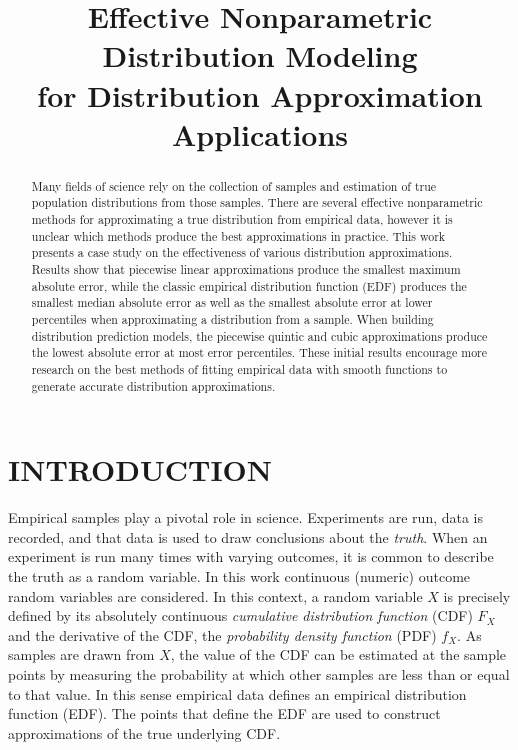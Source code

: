 \documentclass[letterpaper, 10 pt, conference]{ieeeconf}  %
\title{\LARGE \bf Effective Nonparametric Distribution Modeling \\ for Distribution Approximation Applications }
\begin{document}
\maketitle
\thispagestyle{empty}
\pagestyle{empty}

\begin{abstract}

Many fields of science rely on the collection of samples and estimation of true population distributions from those samples. There are several effective nonparametric methods for approximating a true distribution from empirical data, however it is unclear which methods produce the best approximations in practice. This work presents a case study on the effectiveness of various distribution approximations. Results show that piecewise linear approximations produce the smallest maximum absolute error, while the classic empirical distribution function (EDF) produces the smallest median absolute error as well as the smallest absolute error at lower percentiles when approximating a distribution from a sample. When building distribution prediction models, the piecewise quintic and cubic approximations produce the lowest absolute error at most error percentiles. These initial results encourage more research on the best methods of fitting empirical data with smooth functions to generate accurate distribution approximations.

\end{abstract}

\section{INTRODUCTION}
\label{sec:introduction}

Empirical samples play a pivotal role in science. Experiments are run, data is recorded, and that data is used to draw conclusions about the \textit{truth}. When an experiment is run many times with varying outcomes, it is common to describe the truth as a random variable. In this work continuous (numeric) outcome random variables are considered. In this context, a random variable $X$ is precisely defined by its absolutely continuous \textit{cumulative distribution function} (CDF) $F_X$ and the derivative of the CDF, the \textit{probability density function} (PDF) $f_X$. As samples are drawn from $X$, the value of the CDF can be estimated at the sample points by measuring the probability at which other samples are less than or equal to that value. In this sense empirical data defines an empirical distribution function (EDF). The points that define the EDF are used to construct approximations of the true underlying CDF.
\end{document}
